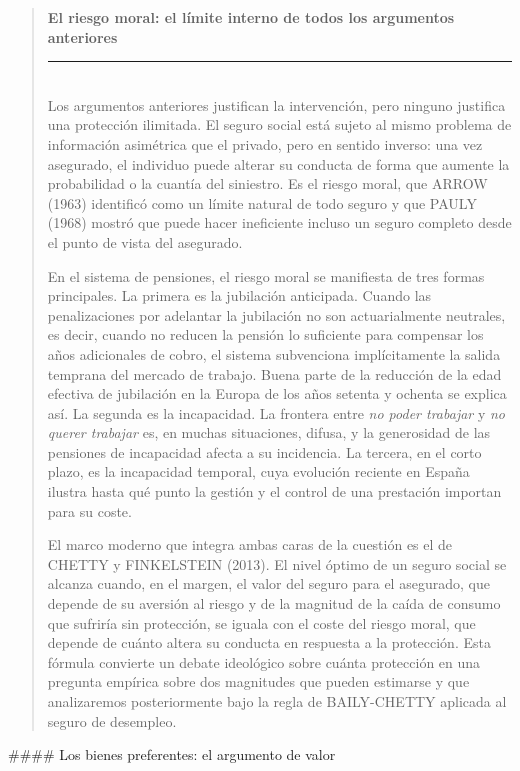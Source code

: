 \documentclass[10pt,a4paper]{article}
\newenvironment{specialblock}[1]{%
      \begin{quote} %
      \small %
      \noindent\textbf{#1}\\[-0.3em] %
      \rule{\linewidth}{0.4pt}\\[0.6em]}{
      \end{quote}}
\begin{document}
\begin{specialblock}{El riesgo moral: el límite interno de todos los argumentos anteriores}
    Los argumentos anteriores justifican la intervención, pero ninguno justifica una protección ilimitada. El seguro social está sujeto al mismo problema de información asimétrica que el privado, pero en sentido inverso: una vez asegurado, el individuo puede alterar su conducta de forma que aumente la probabilidad o la cuantía del siniestro. Es el riesgo moral, que ARROW (1963) identificó como un límite natural de todo seguro y que PAULY (1968) mostró que puede hacer ineficiente incluso un seguro completo desde el punto de vista del asegurado.

    En el sistema de pensiones, el riesgo moral se manifiesta de tres formas principales. La primera es la jubilación anticipada. Cuando las penalizaciones por adelantar la jubilación no son actuarialmente neutrales, es decir, cuando no reducen la pensión lo suficiente para compensar los años adicionales de cobro, el sistema subvenciona implícitamente la salida temprana del mercado de trabajo. Buena parte de la reducción de la edad efectiva de jubilación en la Europa de los años setenta y ochenta se explica así. La segunda es la incapacidad. La frontera entre \textit{no poder trabajar} y \textit{no querer trabajar} es, en muchas situaciones, difusa, y la generosidad de las pensiones de incapacidad afecta a su incidencia. La tercera, en el corto plazo, es la incapacidad temporal, cuya evolución reciente en España ilustra hasta qué punto la gestión y el control de una prestación importan para su coste.
    
    El marco moderno que integra ambas caras de la cuestión es el de CHETTY y FINKELSTEIN (2013). El nivel óptimo de un seguro social se alcanza cuando, en el margen, el valor del seguro para el asegurado, que depende de su aversión al riesgo y de la magnitud de la caída de consumo que sufriría sin protección, se iguala con el coste del riesgo moral, que depende de cuánto altera su conducta en respuesta a la protección. Esta fórmula convierte un debate ideológico sobre cuánta protección en una pregunta empírica sobre dos magnitudes que pueden estimarse y que analizaremos posteriormente bajo la regla de BAILY-CHETTY aplicada al seguro de desempleo.
\end{specialblock}


#### Los bienes preferentes: el argumento de valor
\end{document}
